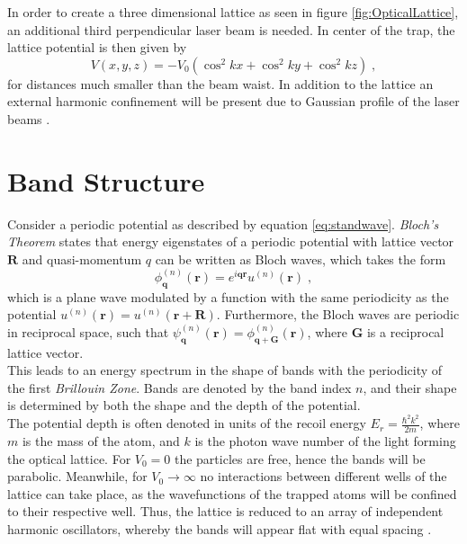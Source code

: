 In order to create a three dimensional lattice as seen in figure \ref{fig:OpticalLattice}, an additional third perpendicular laser beam is needed. In center of the trap, the lattice potential is then given by
\begin{equation}
	V(x,y,z) = - V_0 \left( \cos^2{k x } + \cos^2{k y } + \cos^2{k z } \right) \; ,
\end{equation}
for distances much smaller than the beam waist. In addition to the lattice an external harmonic confinement will be present due to Gaussian profile of the laser beams \cite{manybodyBloch}.

\section{Band Structure}
Consider a periodic potential as described by equation \ref{eq:standwave}. \textit{Bloch's Theorem} states that energy eigenstates of a periodic potential with lattice vector $\boldsymbol{R}$ and quasi-momentum $q$ can be written as Bloch waves, which takes the form
\begin{equation}
	\phi_{\boldsymbol{q}}^{(n)}(\boldsymbol{r}) = e^{i \boldsymbol{q} \boldsymbol{r}} u^{(n)}(\boldsymbol{r}) \; ,
\end{equation}
which is a plane wave modulated by a function with the same periodicity as the potential $u^{(n)}(\boldsymbol{r}) = u^{(n)}(\boldsymbol{r} + \boldsymbol{R})$. Furthermore, the Bloch waves are periodic in reciprocal space, such that $\psi_{\boldsymbol{q}}^{(n)}(\boldsymbol{r}) = \phi_{\boldsymbol{q} + \boldsymbol{G}}^{(n)}(\boldsymbol{r})$, where $\boldsymbol{G}$ is a reciprocal lattice vector. \cite{kittel} \\
This leads to an energy spectrum in the shape of bands with the periodicity of the first \textit{Brillouin Zone}. Bands are denoted by the band index $n$, and their shape is determined by both the shape and the depth of the potential.\\
The potential depth is often denoted in units of the recoil energy $E_r = \frac{\hbar ^2 k^2}{2 m}$, where $m$ is the mass of the atom, and $k$ is the photon wave number of the light forming the optical lattice. For $V_0 = 0$ the particles are free, hence the bands will be parabolic. Meanwhile, for $V_0 \rightarrow \infty$ no interactions between different wells of the lattice can take place, as the wavefunctions of the trapped atoms will be confined to their respective well. Thus, the lattice is reduced to an array of independent harmonic oscillators, whereby the bands will appear flat with equal spacing \cite{greiner}. 

